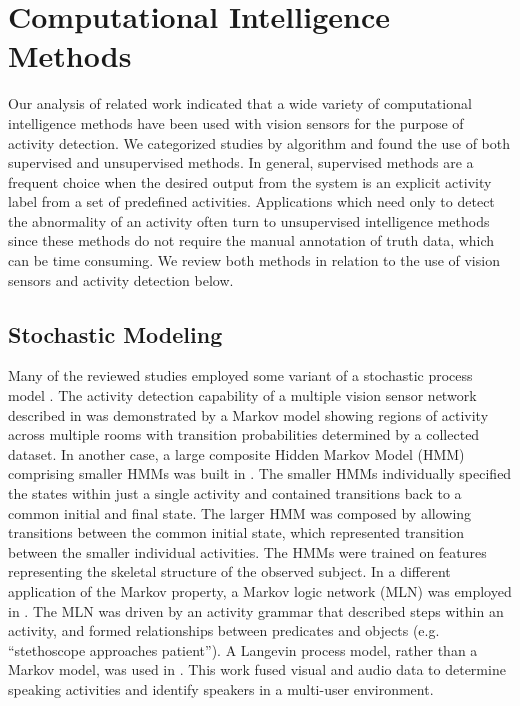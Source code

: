 \documentclass[12pt]{report}
\begin{document}
\section{Computational Intelligence Methods}

Our analysis of related work indicated that a wide variety of computational intelligence methods have been used with vision sensors for the purpose of activity detection. We categorized studies by algorithm and found the use of both supervised and unsupervised methods. In general, supervised methods are a frequent choice when the desired output from the system is an explicit activity label from a set of predefined activities. Applications which need only to detect the abnormality of an activity often turn to unsupervised intelligence methods since these methods do not require the manual annotation of truth data, which can be time consuming. We review both methods in relation to the use of vision sensors and activity detection below. 

\subsection{Stochastic Modeling}

Many of the reviewed studies employed some variant of a stochastic process model \cite{Rowe2007, Figueroa-Angulo2013, Lim2009, Chakraborty2013}. The activity detection capability of a multiple vision sensor network described in \cite{Rowe2007} was demonstrated by a Markov model showing regions of activity across multiple rooms with transition probabilities determined by a collected dataset. In another case, a large composite Hidden Markov Model (HMM) comprising smaller HMMs was built in \cite{Figueroa-Angulo2013}. The smaller HMMs individually specified the states within just a single activity and contained transitions back to a common initial and final state. The larger HMM was composed by allowing transitions between the common initial state, which represented transition between the smaller individual activities. The HMMs were trained on features representing the skeletal structure of the observed subject. In a different application of the Markov property, a Markov logic network (MLN) was employed in \cite{Chakraborty2013}. The MLN was driven by an activity grammar that described steps within an activity, and formed relationships between predicates and objects (e.g. “stethoscope approaches patient”). A Langevin process model, rather than a Markov model, was used in \cite{Lim2009}. This work fused visual and audio data to determine speaking activities and identify speakers in a multi-user environment. 
\end{document}
